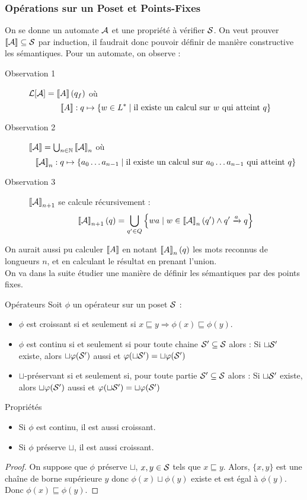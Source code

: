 \documentclass{cours}
\begin{document}
\subsubsection{Opérations sur un Poset et Points-Fixes}
On se donne un automate $\mathcal{A}$ et une propriété à vérifier $\mathcal{S}$. On veut prouver $\left\llbracket \mathcal{A} \right\rrbracket \subseteq \mathcal{S}$ par induction, il faudrait donc pouvoir définir de manière constructive les sémantiques. Pour un automate, on observe :
\begin{description}
    \item[Observation 1] $\mathcal{L}[\mathcal{A}] = \left\llbracket A \right\rrbracket(q_{f})$ où \[\left\llbracket A \right\rrbracket: q \mapsto \left\{w \in L^{*}\mid \text{il existe un calcul sur } w \text{ qui atteint } q\right\}\]
    \item[Observation 2] $\left\llbracket \mathcal{A} \right\rrbracket = \bigcup_{n \in \mathbb{N}} \left\llbracket \mathcal{A} \right\rrbracket_{n}$ où \[\left\llbracket \mathcal{A} \right\rrbracket_{n} : q \mapsto \{a_{0}\ldots a_{n - 1}\mid \text{il existe un calcul sur } a_{0} \ldots a_{n - 1}\text{ qui atteint } q\}\]
    \item[Observation 3] $\left\llbracket \mathcal{A} \right\rrbracket_{n + 1}$ se calcule récursivement : 
    \[
        \left\llbracket \mathcal{A} \right\rrbracket_{n + 1}(q) = \bigcup_{q'\in Q} \left\{wa \mid w \in \left\llbracket \mathcal{A} \right\rrbracket_{n}(q') \land q'\xrightarrow{a}q\right\}
    \]
\end{description}
On aurait aussi pu calculer $\left\llbracket A \right\rrbracket$ en notant $\left\llbracket A \right\rrbracket_{n}(q)$ les mots reconnus de longueurs $n$, et en calculant le résultat en prenant l'union. \\
On va dans la suite étudier une manière de définir les sémantiques par des points fixes.

\begin{définition}{Opérateurs}{}
    Soit $\phi$ un opérateur sur un poset $\mathcal{S}$ : 
    \begin{itemize}
        \item $\phi$ est croissant si et seulement si $x \sqsubseteq y \Longrightarrow \phi(x) \sqsubseteq \phi(y)$.
        \item $\phi$ est continu si et seulement si pour toute chaine $\mathcal{S}' \subseteq \mathcal{S}$ alors : Si $\sqcup \mathcal{S}'$ existe, alors $\sqcup \varphi(\mathcal{S}')$ aussi et $\varphi(\sqcup \mathcal{S}') = \sqcup \varphi(\mathcal{S}')$
        \item $\sqcup$-préservant si et seulement si, pour toute partie $\mathcal{S}' \subseteq \mathcal{S}$ alors : Si $\sqcup \mathcal{S}'$ existe, alors $\sqcup \varphi(\mathcal{S}')$ aussi et $\varphi(\sqcup \mathcal{S}') = \sqcup \varphi(\mathcal{S}')$
    \end{itemize}
\end{définition}
\begin{propositionfr}{Propriétés}{}
    \begin{itemize}
        \item Si $\phi$ est continu, il est aussi croissant.
        \item Si $\phi$ préserve $\sqcup$, il est aussi croissant.
    \end{itemize}
\end{propositionfr}
\begin{proof}
    On suppose que $\phi$ préserve $\sqcup$, $x, y \in \mathcal{S}$ tels que $x \sqsubseteq y$. Alors, $\{x, y\}$ est une chaîne de borne supérieure $y$ donc $\phi(x) \sqcup \phi(y)$ existe et est égal à $\phi(y)$. Donc $\phi(x) \sqsubseteq \phi(y)$.
\end{proof}
\end{document}
